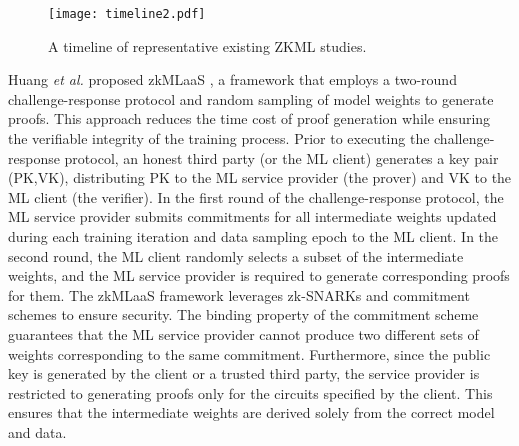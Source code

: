 \documentclass[journal]{IEEEtran}
\begin{document}
\begin{figure*}[!t]
    \centering
    \texttt{[image: timeline2.pdf]}
    \caption{A timeline of representative existing ZKML studies.}
    \label{f4}
\end{figure*}

Huang \emph{et al.} proposed zkMLaaS \cite{huang2022zkmlaas}, a framework that employs a two-round challenge-response protocol and random sampling of model weights to generate proofs. This approach reduces the time cost of proof generation while ensuring the verifiable integrity of the training process. Prior to executing the challenge-response protocol, an honest third party (or the ML client) generates a key pair (PK,VK), distributing PK to the ML service provider (the prover) and VK to the ML client (the verifier). In the first round of the challenge-response protocol, the ML service provider submits commitments for all intermediate weights updated during each training iteration and data sampling epoch to the ML client. In the second round, the ML client randomly selects a subset of the intermediate weights, and the ML service provider is required to generate corresponding proofs for them. The zkMLaaS framework leverages zk-SNARKs and commitment schemes to ensure security. The binding property of the commitment scheme guarantees that the ML service provider cannot produce two different sets of weights corresponding to the same commitment. Furthermore, since the public key is generated by the client or a trusted third party, the service provider is restricted to generating proofs only for the circuits specified by the client. This ensures that the intermediate weights are derived solely from the correct model and data.
\end{document}
